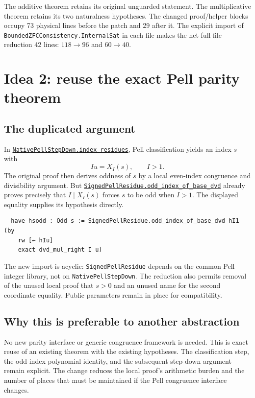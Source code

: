 \documentclass[11pt,letterpaper]{article}
\newcommand{\code}[1]{\nolinkurl{#1}}
\newcommand{\repo}[2]{\href{https://github.com/VladimirReshetnikov/ProveIt/blob/b310142330df89e48413c8fce62e7de223e1c7d5/#1}{#2}}
\newcommand{\modulelink}[2]{\repo{Computability/DiophantineConsistency/Lean/DiophantineConsistency/#1.lean}{#2}}
\begin{document}
The additive theorem retains its original unguarded statement. The
multiplicative theorem retains its two naturalness hypotheses. The changed
proof/helper blocks occupy 73 physical lines before the patch and 29 after it.
The explicit import of \code{BoundedZFCConsistency.InternalSat} in each file
makes the net full-file reduction 42 lines: $118\to96$ and $60\to40$.

\section{Idea 2: reuse the exact Pell parity theorem}

\subsection{The duplicated argument}

In \modulelink{NativePellStepDown}{\code{NativePellStepDown.index_residues}},
Pell classification yields an index $s$ with
\[
 Iu=X_I(s),\qquad I>1.
\]
The original proof then derives oddness of $s$ by a local even-index
congruence and divisibility argument. But
\modulelink{SignedPellResidue}{\code{SignedPellResidue.odd_index_of_base_dvd}}
already proves precisely that $I\mid X_I(s)$ forces $s$ to be odd when $I>1$.
The displayed equality supplies its hypothesis directly.

\begin{Verbatim}
  have hsodd : Odd s := SignedPellResidue.odd_index_of_base_dvd hI1 (by
    rw [← hIu]
    exact dvd_mul_right I u)
\end{Verbatim}

The new import is acyclic: \code{SignedPellResidue} depends on the common Pell
integer library, not on \code{NativePellStepDown}. The reduction also permits
removal of the unused local proof that $s>0$ and an unused name for the second
coordinate equality. Public parameters remain in place for compatibility.

\subsection{Why this is preferable to another abstraction}

No new parity interface or generic congruence framework is needed. This is
exact reuse of an existing theorem with the existing hypotheses. The
classification step, the odd-index polynomial identity, and the subsequent
step-down argument remain explicit. The change reduces the local proof's
arithmetic burden and the number of places that must be maintained if the Pell
congruence interface changes.
\end{document}
